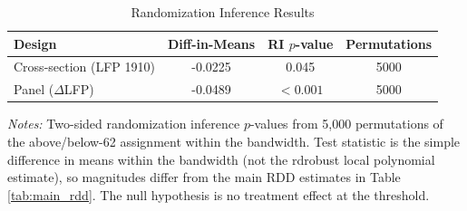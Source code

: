 \begin{table}[htbp]
\centering
\caption{Randomization Inference Results}
\label{tab:ri}
\begin{tabular}{lccc}
\toprule
  Design & Diff-in-Means & RI $p$-value & Permutations \\
\midrule
  Cross-section (LFP 1910) & -0.0225 & 0.045 & 5000 \\
  Panel ($\Delta$LFP) & -0.0489 & $< 0.001$ & 5000 \\
\bottomrule
\end{tabular}
\begin{tablenotes}[flushleft]
\small
\item \textit{Notes:} Two-sided randomization inference $p$-values from 5,000 permutations of the above/below-62 assignment within the bandwidth. Test statistic is the simple difference in means within the bandwidth (not the rdrobust local polynomial estimate), so magnitudes differ from the main RDD estimates in Table \ref{tab:main_rdd}. The null hypothesis is no treatment effect at the threshold.
\end{tablenotes}
\end{table}
